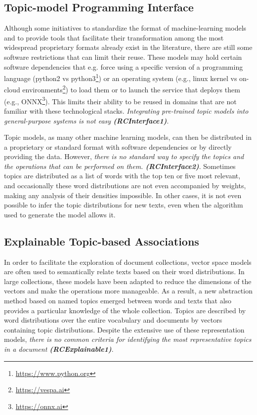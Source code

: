 \subsection{Topic-model Programming Interface}

Although some initiatives to standardize the format of machine-learning models and to provide tools that facilitate their transformation among the most widespread proprietary formats already exist in the literature, there are still some software restrictions that can limit their reuse. These models may hold certain software dependencies that e.g. force using a specific version of a programming language (python2 vs python3\footnote{\url{https://www.python.org}}) or an operating system (e.g., linux kernel vs on-cloud environments\footnote{\url{https://vespa.ai}}) to load them or to launch the service that deploys them (e.g., ONNX\footnote{\url{https://onnx.ai}}). This limits their ability to be reused in domains that are not familiar with these technological stacks. \textit{Integrating pre-trained topic models into general-purpose systems is not easy \textbf{(RCInterface1)}}.


Topic models, as many other machine learning models, can then be distributed in a proprietary or standard format with software dependencies or by directly providing the data. However, \textit{there is no standard way to specify the topics and the operations that can be performed on them. \textbf{(RCInterface2)}}. Sometimes topics are distributed as a list of words with the top ten or five most relevant, and occasionally these word distributions are not even accompanied by weights, making any analysis of their densities impossible. In other cases, it is not even possible to infer the topic distributions for new texts, even when the algorithm used to generate the model allows it.


\subsection{Explainable Topic-based Associations}

In order to facilitate the exploration of document collections, vector space models are often used to semantically relate texts based on their word distributions. In large collections, these models have been adapted to reduce the dimensions of the vectors and make the operations more manageable. As a result, a new abstraction method based on named topics emerged between words and texts that also provides a particular knowledge of the whole collection. Topics are described by word distributions over the entire vocabulary and documents by vectors containing topic distributions. Despite the extensive use of these representation models, \textit{there is no common criteria for identifying the most representative topics in a document \textbf{(RCExplainable1)}}. 

